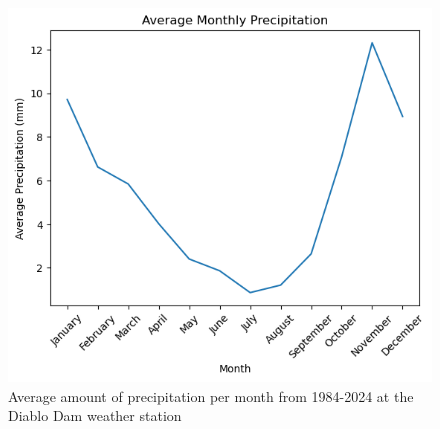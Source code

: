 \documentclass{article}
\begin{document}
\begin{figure}
    \centering
    \includegraphics[width=\textwidth]{Plots/monthly_precip.png}
    \caption{Average amount of precipitation per month from 1984-2024 at the Diablo Dam weather station}
    \label{fig:monthly_precip}
\end{figure}    
\FloatBarrier
\end{document}
